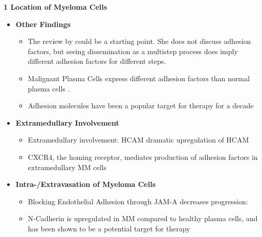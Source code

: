\textbf{1 Location of Myeloma Cells}
\begin{itemize}
      \item \textbf{Other Findings}
            \begin{itemize}
                  \item The review by
                        \citet{zeissigTumourDisseminationMultiple2020} could be
                        a starting point. She does not discuss adhesion factors,
                        but seeing dissemination as a multistep process does
                        imply different adhesion factors for different steps.
                  \item Malignant Plasma Cells express different adhesion factors
                        than normal plasma cells \cite{cookRoleAdhesionMolecules1997, bouzerdanAdhesionMoleculesMultiple2022}.

                  \item Adhesion molecules have been a popular target for therapy for a decade \cite{nairChapterSixEmerging2012}
            \end{itemize}

      \item \textbf{Extramedullary Involvement}
            \begin{itemize}
                  \item Extramedullary involvement: HCAM dramatic upregulation of HCAM
                  \item CXCR4, the homing receptor, mediates production of
                        adhesion factors in extramedullary MM cells \cite{roccaroCXCR4RegulatesExtraMedullary2015}
            \end{itemize}

      \item \textbf{Intra-/Extravasation of Myeloma Cells}
            \begin{itemize}
                  \item Blocking Endothelial Adhesion through JAM-A decreases progression: \cite{solimandoHaltingViciousCycle2020}
                  \item N-Cadherin is upregulated in MM compared to healthy plasma cells, and has been shown to be a potential target for therapy \cite{mrozikTherapeuticTargetingNcadherin2015}

            \end{itemize}


\end{itemize}
